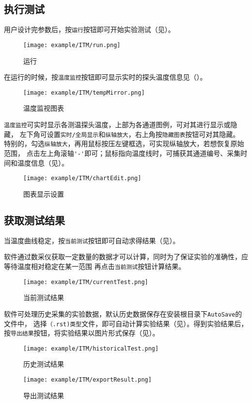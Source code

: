 \subsection{执行测试}
用户设计完参数后，按\lstinline{运行}按钮即可开始实验测试（见）。
\begin{figure}[htbp]
	\centering
	\texttt{[image: example/ITM/run.png]}
	\caption{ 运行 \label{fig:exmp_itm_run}}
\end{figure}
在运行的时候，按\lstinline{温度监控}按钮即可显示实时的探头温度信息见（）。
\begin{figure}[htbp]
	\centering
	\texttt{[image: example/ITM/tempMirror.png]}
	\caption{ 温度监视图表 \label{fig:exmp_itm_tempMirror}}
\end{figure}
\lstinline{温度监控}可实时显示各测温探头温度，上部为各通道图例，可对其进行显示或隐藏，
左下角可设置\lstinline{实时/全局显示}和\lstinline{纵轴放大}，右上角按\lstinline{隐藏图表}按钮可对其隐藏。
特别的，勾选\lstinline{纵轴放大}，再用鼠标按压左键框选，可实现纵轴放大，若想恢复原始范围，
点击左上角滚轴\lstinline{'-'}即可；鼠标指向温度线时，可捕获其通道编号、采集时间和温度信息（见）。\\
\begin{figure}[htbp]
	\centering
	\texttt{[image: example/ITM/chartEdit.png]}
	\caption{ 图表显示设置 \label{fig:exmp_itm_chartEdit}}
\end{figure}

\subsection{获取测试结果}
	当温度曲线稳定，按\lstinline{当前测试}按钮即可自动求得结果（见）。
\begin{note}
	软件通过数采仪获取一定数量的数据才可以计算，同时为了保证实验的准确性，应等待温度相对稳定在某一范围
再点击\lstinline{当前测试}按钮计算结果。
\end{note}
\begin{figure}[htbp]
	\centering
	\texttt{[image: example/ITM/currentTest.png]}
	\caption{ 当前测试结果 \label{fig:exmp_itm_currentTest}}
\end{figure}
软件可处理历史采集的实验数据，默认历史数据保存在安装根目录下\lstinline{AutoSave}的文件中，
选择\lstinline{（.rst)类型}文件，即可自动计算实验结果（见）。得到实验结果后，
按\lstinline{导出结果}按钮，将实验结果以图片形式保存（见）。
\begin{figure}[htbp]
	\centering
	\texttt{[image: example/ITM/historicalTest.png]}
	\caption{ 历史测试结果 \label{fig:exmp_itm_historicalTest}}
\end{figure}

\begin{figure}[htbp]
	\centering
	\texttt{[image: example/ITM/exportResult.png]}
	\caption{ 导出测试结果 \label{fig:exmp_itm_exportResult}}
\end{figure}